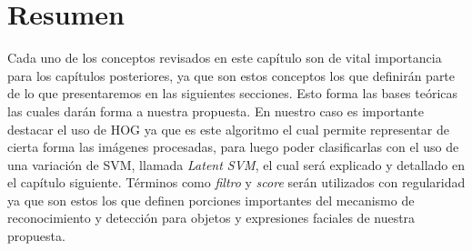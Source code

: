 \section{Resumen}\label{sec:resumen}

Cada uno de los conceptos revisados en este capítulo son de vital importancia para los capítulos posteriores, ya que son estos conceptos los que definirán parte de lo que presentaremos en las siguientes secciones. Esto forma las bases teóricas las cuales darán forma a nuestra propuesta. En nuestro caso es importante destacar el uso de HOG ya que es este algoritmo el cual permite representar de cierta forma las imágenes procesadas, para luego poder clasificarlas con el uso de una variación de SVM, llamada \textit{Latent SVM}, el cual será explicado y detallado en el capítulo siguiente. Términos como \textit{filtro} y \textit{score} serán utilizados con regularidad ya que son estos los que definen porciones importantes del mecanismo de reconocimiento y detección para objetos y expresiones faciales de nuestra propuesta.